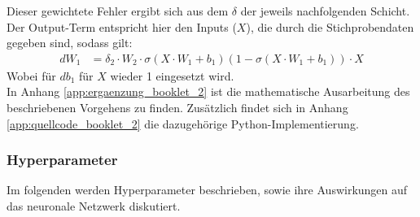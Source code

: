 Dieser gewichtete Fehler ergibt sich aus dem $\delta$ der jeweils nachfolgenden Schicht. Der Output-Term entspricht hier den Inputs ($X$), die durch die Stichprobendaten gegeben sind, sodass gilt:
\begin{align*}
dW_{1} &= \delta_{2}\cdot W_{2} \cdot \sigma(X\cdot W_{1}+b_{1})(1- \sigma(X\cdot W_{1}+b_{1})) \cdot X
\end{align*}
\noindent
Wobei für $db_{1}$ für $X$ wieder 1 eingesetzt wird.\\
\noindent \hspace*{7mm}
In Anhang \ref{app:ergaenzung_booklet_2} ist die mathematische Ausarbeitung des beschriebenen Vorgehens zu finden. Zusätzlich findet sich in Anhang \ref{app:quellcode_booklet_2} die dazugehörige Python-Implementierung.
\subsubsection{Hyperparameter}
Im folgenden werden Hyperparameter beschrieben, sowie ihre Auswirkungen auf das neuronale Netzwerk diskutiert.
